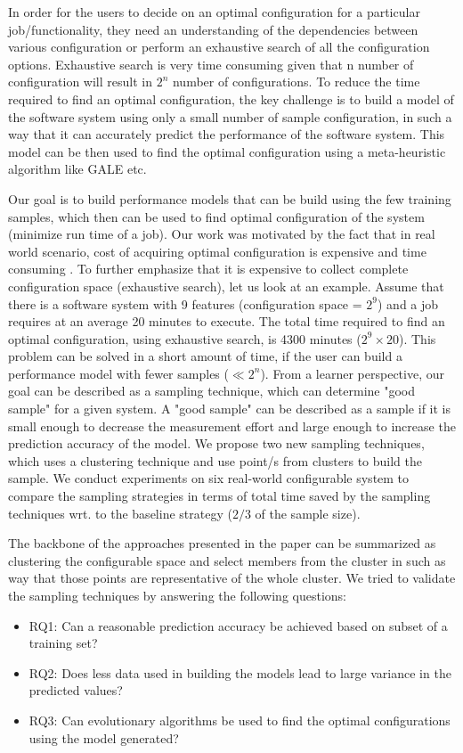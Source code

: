 \documentclass{sig-alternative}
\newcommand{\bi}{\begin{itemize}}%
\newcommand{\ei}{\end{itemize}}
\begin{document}
 In order for the users to decide on an optimal configuration for a particular job/functionality, they need an understanding of the dependencies between various configuration or perform an exhaustive search of all the configuration options. Exhaustive search is very time consuming given that n number of configuration will result in $2^n$ number of configurations. To reduce the time required to find an optimal configuration, the key challenge is to build a model of the software system using only a small number of sample configuration, in such a way that it can accurately predict the performance of the software system. This model can be then used to find the optimal configuration using a meta-heuristic algorithm like GALE etc. 
 

 
Our goal is to build performance models that can be build using the few training samples, which then can be used to find optimal configuration of the system (minimize run time of a job). Our work was motivated by the fact that in real world scenario, cost of acquiring optimal configuration is expensive and time consuming \cite{weiss2008maximizing}. To further emphasize that it is expensive to collect complete configuration space (exhaustive search), let us look at an example. Assume that there is a software system with 9 features (configuration space = $2^9$) and a job requires at an average 20 minutes to execute. The total time required to find an optimal configuration, using exhaustive search, is 4300 minutes ($2^9 \times 20$). This problem can be solved in a short amount of time, if the user can build a performance model with fewer samples ($\ll 2^n$). From a learner perspective, our goal can be described as a sampling technique, which can determine "good sample" for a given system. A "good sample" can be described as a sample if it is small enough to decrease the measurement effort and large enough to increase the prediction accuracy of the model. We propose two new sampling techniques, which uses a clustering technique and use point/s from clusters to build the sample. We conduct experiments on six real-world configurable system to compare the sampling strategies in terms of total time saved by the sampling techniques wrt. to the baseline strategy ($2/3$ of the sample size).

The backbone of the approaches presented in the paper can be summarized as clustering the configurable space and select members from the cluster in such as way that those points are representative of the whole cluster. We tried to validate the sampling techniques by answering the following questions:
        \bi
            \item{RQ1: Can a reasonable prediction accuracy be achieved based on subset of a training set?}
            \item{RQ2: Does less data used in building the models lead to large variance in the predicted values?}
            \item{RQ3: Can evolutionary algorithms be used to find the optimal configurations using the model generated?}
        \ei
 
\end{document}
